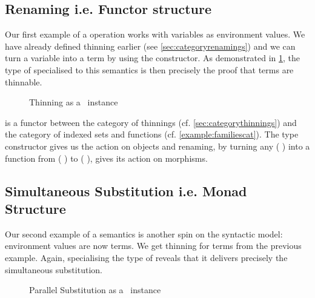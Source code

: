 \subsection{Renaming i.e. Functor structure}

Our first example of a  operation works with variables as
environment values. We have already defined thinning earlier (see
\cref{sec:categoryrenamings}) and we can turn a variable into a term by using
the  constructor. As demonstrated in \cref{fig:synren},
the type of  specialised to this
semantics is then precisely the proof that terms are thinnable.

\begin{figure}[h]
\begin{minipage}[t]{0.5\textwidth}
\end{minipage}\begin{minipage}[t]{0.5\textwidth}
\end{minipage}
\caption{Thinning as a ~instance\label{fig:synren}}
\end{figure}

 is a functor between the category of thinnings
(cf. \cref{sec:categorythinnings}) and the category of indexed sets and
functions (cf. \cref{example:familiescat}). The type constructor
gives us the action on objects and renaming, by turning any
{(  )} into a function from
{(  )} to {(  )}, gives
its action on morphisms.

\subsection{Simultaneous Substitution i.e. Monad Structure}

Our second example of a semantics is another spin on the syntactic model:
environment values are now terms. We get thinning for terms from the
previous example. Again, specialising the type of 
reveals that it delivers precisely the simultaneous substitution.

\begin{figure}[h]
\begin{minipage}[t]{0.4\textwidth}
\end{minipage}\begin{minipage}[t]{0.6\textwidth}
\end{minipage}
\caption{Parallel Substitution as a ~instance\label{fig:synsub}}
\end{figure}

